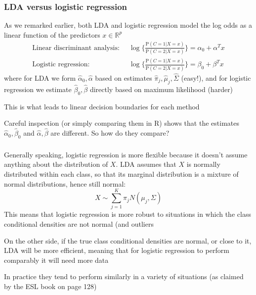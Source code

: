 \documentclass[mathserif]{beamer}
\def\P{\mathrm{P}}
\def\R{\mathds{R}}
\def\hbeta{\hat{\beta}}
\def\red{\color[rgb]{0.8,0,0}}
\begin{document}
\begin{frame}
\frametitle{LDA versus logistic regression}
As we remarked earlier, both LDA and logistic regression model the log
odds as a linear function of the predictors $x \in \R^p$
\begin{align*}
\text{Linear discriminant analysis:} \;\;
&\log\Big\{\frac{\P(C=1|X=x)}{\P(C=2|X=x)}\Big\}
= \alpha_0+\alpha^T x \\
\text{Logistic regression:} \;\;
& \log\Big\{\frac{\P(C=1|X=x)}{\P(C=2|X=x)}\Big\}
= \beta_0+\beta^T x
\end{align*}
where for LDA we form $\hat{\alpha}_0,\hat{\alpha}$ based on 
estimates $\hat{\pi}_j,\hat{\mu}_j,\hat{\Sigma}$
(easy!), and for logistic regression we estimate 
$\hbeta_0,\hbeta$ directly based on maximum likelihood (harder)

\bigskip
This is what leads to linear decision boundaries for each method

\bigskip
Careful inspection (or simply comparing them in R) shows that the 
estimates $\hat{\alpha}_0,\hbeta_0$ and $\hat{\alpha},\hbeta$
are {\red different}. So how do they compare?
\end{frame}

\begin{frame}
\frametitle{}
\smallskip
\smallskip
Generally speaking, logistic regression is more flexible because it doesn't assume
anything about the distribution of $X$. LDA assumes that $X$ is normally distributed 
within each class, so that its marginal distribution is a mixture of normal distributions, 
hence still normal:
$$X \sim \sum_{j=1}^K \pi_j N(\mu_j,\Sigma)$$
This means that logistic regression is {\red more robust} to situations in which the 
class conditional densities are not normal (and outliers

\bigskip
On the other side, if the true class conditional densities are normal, or close to it, LDA will be
{\red more efficient}, meaning that for logistic regression to perform comparably it will need more data

\bigskip
In practice they tend to perform similarly in a variety of situations (as claimed by the ESL book on page
128)
\end{frame}
\end{document}
